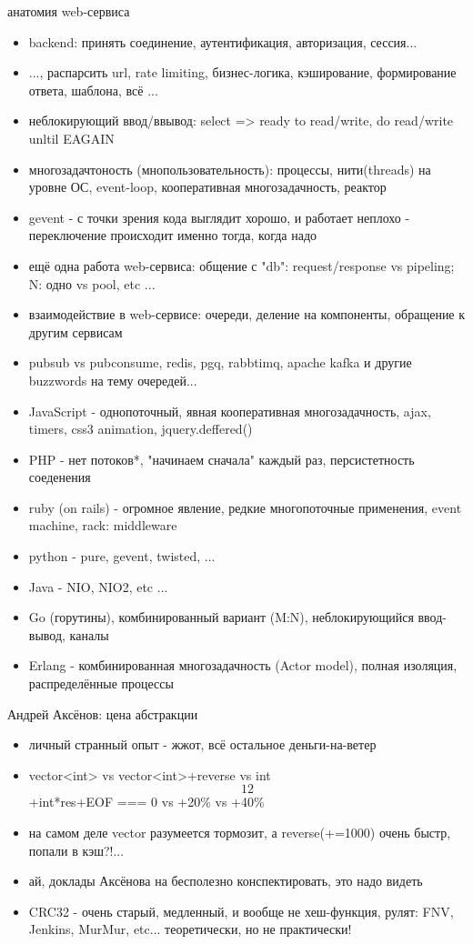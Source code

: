 \documentclass[aspectratio=169]{beamer}
\begin{document}
\begin{frame}{анатомия web-сервиса}
\begin{itemize}
  \item backend: принять соединение, аутентификация, авторизация, сессия...
  \item ..., распарсить url, rate limiting, бизнес-логика, кэширование, формирование ответа, шаблона, всё ...
  \item неблокирующий ввод/ввывод: select => ready to read/write, do read/write unltil EAGAIN
  \item многозадачтоность (мнопользовательность): процессы, нити(threads) на уровне ОС, event-loop, кооперативная многозадачность, реактор
  \item gevent - с точки зрения кода выглядит хорошо, и работает неплохо - переключение происходит именно тогда, когда надо
  \item ещё одна работа web-сервиса: общение с "db": request/response vs pipeling; N: одно vs pool, etc ...
  \item взаимодействие в web-сервисе: очереди, деление на компоненты, обращение к другим сервисам
  \item pubsub vs pubconsume, redis, pgq, rabbtimq, apache kafka и другие buzzwords на тему очередей...
  \item JavaScript - однопоточный, явная кооперативная многозадачность, ajax, timers, css3 animation, jquery.deffered()
  \item PHP - нет потоков*, "начинаем сначала" каждый раз, персистетность соеденения
  \item ruby (on rails) - огромное явление, редкие многопоточные применения, event machine, rack: middleware
  \item python - pure, gevent, twisted, ...
  \item Java - NIO, NIO2, etc ...
  \item Go (горутины), комбинированный вариант (M:N), неблокирующийся ввод-вывод, каналы
  \item Erlang - комбинированная многозадачность (Actor model), полная изоляция, распределённые процессы
\end{itemize}
\end{frame}
  
\begin{frame}{Андрей Аксёнов: цена абстракции}
\begin{itemize}
  \item личный странный опыт - жжот, всё остальное деньги-на-ветер
  \item vector<int> vs vector<int>+reverse vs int\[12\]+int*res+EOF === 0 vs +20\% vs +40\%
  \item на самом деле vector разумеется тормозит, а reverse(+=1000) очень быстр, попали в кэш?!...
  \item ай, доклады Аксёнова на бесполезно конспектировать, это надо видеть
  \item CRC32 - очень старый, медленный, и вообще не хеш-функция, рулят: FNV, Jenkins, MurMur, etc... теоретически, но не практически!
\end{itemize}
\end{frame}
  
\end{document}
